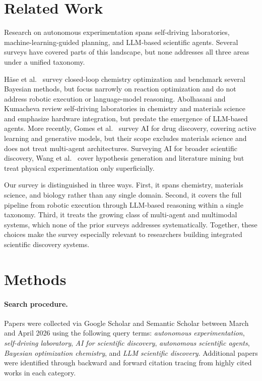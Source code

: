 \documentclass{article}
\begin{document}
\section{Related Work}
\label{sec:related}

Research on autonomous experimentation spans self-driving laboratories, machine-learning-guided planning, and LLM-based scientific agents. Several surveys have covered parts of this landscape, but none addresses all three areas under a unified taxonomy.

Häse et al.\ \cite{hase2019olympus} survey closed-loop chemistry optimization and benchmark several Bayesian methods, but focus narrowly on reaction optimization and do not address robotic execution or language-model reasoning. Abolhasani and Kumacheva \cite{abolhasani2023rise} review self-driving laboratories in chemistry and materials science and emphasize hardware integration, but predate the emergence of LLM-based agents. More recently, Gomes et al.\ \cite{gomes2023ai} survey AI for drug discovery, covering active learning and generative models, but their scope excludes materials science and does not treat multi-agent architectures. Surveying AI for broader scientific discovery, Wang et al.\ \cite{wang2023scientific} cover hypothesis generation and literature mining but treat physical experimentation only superficially.

Our survey is distinguished in three ways. First, it spans chemistry, materials science, and biology rather than any single domain. Second, it covers the full pipeline from robotic execution through LLM-based reasoning within a single taxonomy. Third, it treats the growing class of multi-agent and multimodal systems, which none of the prior surveys addresses systematically. Together, these choices make the survey especially relevant to researchers building integrated scientific discovery systems.

\section{Methods}
\label{sec:methods}

\paragraph{Search procedure.}
Papers were collected via Google Scholar and Semantic Scholar between March and April 2026 using the following query terms: \textit{autonomous experimentation}, \textit{self-driving laboratory}, \textit{AI for scientific discovery}, \textit{autonomous scientific agents}, \textit{Bayesian optimization chemistry}, and \textit{LLM scientific discovery}. Additional papers were identified through backward and forward citation tracing from highly cited works in each category.
\end{document}
